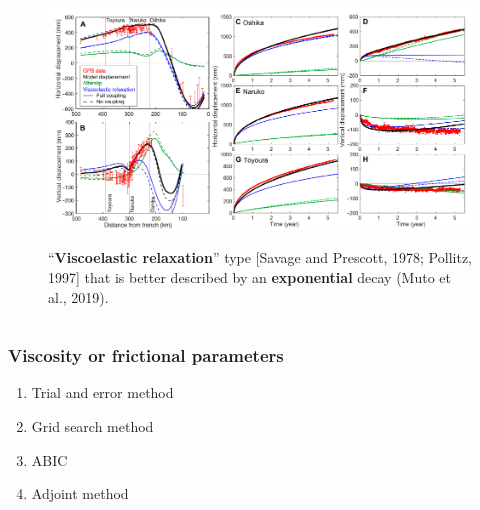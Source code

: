 ﻿\documentclass{beamer}
\begin{document}
\begin{frame}
\begin{columns}[c]
\begin{figure}
  \centering
  \includegraphics[scale=0.2]{./pic/muto2019.png}\\
  \caption{“\textbf{Viscoelastic relaxation}” type [Savage and Prescott, 1978; Pollitz, 1997] that is better described by an \textbf{exponential} decay (Muto et al., 2019).}\label{fig_okada}
\end{figure}

\end{columns}

\end{frame}

\begin{frame}
\frametitle{Viscosity or frictional parameters}
\begin{enumerate}
  \item Trial and error method
  \item Grid search method
  \item ABIC
  \item Adjoint method
\end{enumerate}
\end{frame}
\end{document}
